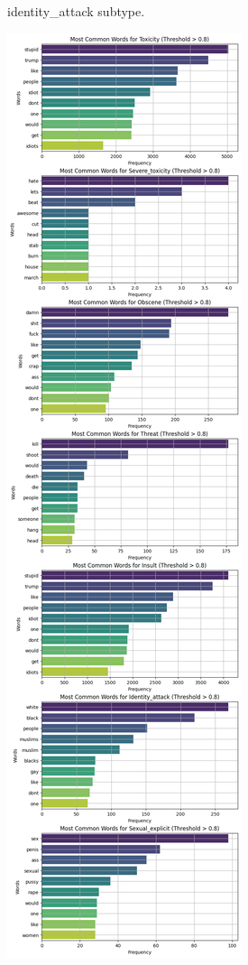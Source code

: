 \documentclass[10pt,a4paper,oneside]{article} %
\begin{document}
\begin{enumerate}
\begin{figure}[h]
\begin{subfigure}{0.49\textwidth}
        \caption{identity\_attack subtype.}
        \label{fig:word_freq_id_attack_cc}
    \end{subfigure}%
    \hfill
    \begin{subfigure}{0.5\textwidth}
        \centering
        \includegraphics[width=\textwidth, clip, trim=0 870 0 870]{replibert/replibert/plots/Word_Frequency_cc.png} 

\end{subfigure}
\end{figure}
\end{enumerate}
\end{document}
